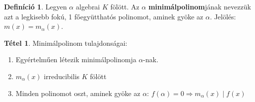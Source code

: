 \documentclass[12pt]{book}
\theoremstyle{plain} %
\theoremstyle{definition} %
\newtheorem{defi/}{Definíció}[section]
\newenvironment{defi}
  {\renewcommand{\qedsymbol}{$\clubsuit$}%
   \pushQED{\qed}\begin{defi/}}
  {\popQED\end{defi/}}
\newtheorem{theo/}{Tétel}[section]
\newenvironment{theo}
  {\renewcommand{\qedsymbol}{$\clubsuit$}%
   \pushQED{\qed}\begin{theo/}}
  {\popQED\end{theo/}}
\theoremstyle{remark}
\renewcommand\qedsymbol{$\blacksquare$}
\numberwithin{equation}{section}  %
\begin{document}
	\begin{defi}
		Legyen $\alpha$ algebrai $K$ fölött. Az $\alpha$ \textbf{minimálpolinom}jának nevezzük azt a legkisebb fokú, 1 főegyütthatós polinomot, aminek gyöke az $\alpha$. Jelölés: $m(x)=m_\alpha(x)$.
	\end{defi}
	\begin{theo}
		Minimálpolinom tulajdonságai:
		\begin{enumerate}
			\item Egyértelműen létezik minimálpolinomja $\alpha$-nak.
			\item $m_\alpha(x)$ irreducibilis $K$ fölött
			\item Minden polinomot oszt, aminek gyöke az $\alpha$: $f(\alpha)=0 \Rightarrow m_\alpha(x) \mid f(x)$
		\end{enumerate}
	\end{theo}
\end{document}
